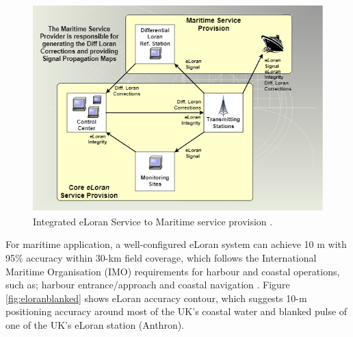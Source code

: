 \begin{figure}[!ht]
    \centering
    \includegraphics[scale=0.7]{Figures/ELORAN_maritime_app.PNG}
    \caption{Integrated eLoran Service to Maritime service provision \cite{InternationalLORANAssociation2007EnhancedApril}.}
    \label{fig:eloranmaritimeapp}
\end{figure}

\noindent For maritime application, a well-configured eLoran system can achieve 10 m with 95\% accuracy within 30-km field coverage, which follows the International Maritime Organisation (IMO) requirements for harbour and coastal operations, such as; harbour entrance/approach and coastal navigation \cite{SharedTutorial}\cite{Son2020ELoran:Areas}\cite{SafarAIONS}. Figure \ref{fig:eloranblanked} shows eLoran accuracy contour, which suggests 10-m positioning accuracy around most of the UK's coastal water and blanked pulse of one of the UK's eLoran station (Anthron).\\

